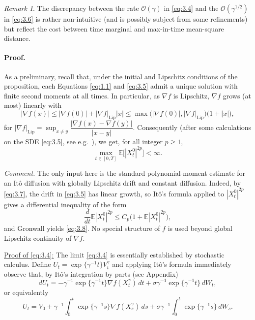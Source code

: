 \documentclass[11pt]{article}
\theoremstyle{remark}
\newtheorem{remark}{Remark}[section]
\begin{document}
\begin{remark}
The discrepancy between the rate $\mathcal{O}(\gamma)$ in \eqref{eq:3.4} and the $\mathcal{O}(\gamma^{1/2})$ in \eqref{eq:3.6} is rather non-intuitive (and is possibly subject from some refinements) but reflect the cost between time marginal and max-in-time mean-square distance.
\end{remark}

\paragraph{Proof.}
As a preliminary, recall that, under the initial and Lipschitz conditions of the proposition, each Equations \eqref{eq:1.1} and \eqref{eq:3.5} admit a unique solution with finite second moments at all times.
In particular, as $\nabla f$ is Lipschitz, $\nabla f$ grows (at most) linearly with
\begin{equation}
\label{eq:3.7}
|\nabla f(x)| \le |\nabla f(0)| + |\nabla f|_{\mathrm{Lip}}|x|
\le \max\bigl(|\nabla f(0)|,|\nabla f|_{\mathrm{Lip}}\bigr)\bigl(1+|x|\bigr),
\end{equation}
for $|\nabla f|_{\mathrm{Lip}}=\sup_{x\neq y}\dfrac{|\nabla f(x)-\nabla f(y)|}{|x-y|}$.
Consequently (after some calculations on the SDE \eqref{eq:3.5}, see e.g.~\cite{ks91}), we get, for all integer $p\ge1$,
\begin{equation}
\label{eq:3.8}
\max_{t\in[0,T]}\mathbb{E}\bigl[|X_t^0|^{2p}\bigr]<\infty.
\end{equation}

{\color{teal}
\noindent\emph{Comment.} The only input here is the standard polynomial-moment estimate for an It\^o diffusion with globally Lipschitz drift and constant diffusion. Indeed, by \eqref{eq:3.7}, the drift in \eqref{eq:3.5} has linear growth, so It\^o's formula applied to $|X_t^0|^{2p}$ gives a differential inequality of the form
\[
\frac{d}{dt}\mathbb{E}|X_t^0|^{2p}\le C_p\bigl(1+\mathbb{E}|X_t^0|^{2p}\bigr),
\]
and Gronwall yields \eqref{eq:3.8}. No special structure of $f$ is used beyond global Lipschitz continuity of $\nabla f$.
}


\underline{Proof of \eqref{eq:3.4}:}
The limit \eqref{eq:3.4} is essentially established by stochastic calculus. Define $U_t=\exp\{\gamma^{-1}t\}V_t^{\gamma}$
and applying It\^o's formula immediately observe that, by It\^o's integration by parts (see Appendix)
\[
dU_t=-\gamma^{-1}\exp\{\gamma^{-1}t\}\nabla f(X_t^{\gamma})\,dt+\sigma\gamma^{-1}\exp\{\gamma^{-1}t\}\,dW_t,
\]
or equivalently
\[
U_t=V_0+\gamma^{-1}\int_0^t \exp\{\gamma^{-1}s\}\nabla f(X_s^{\gamma})\,ds+\sigma\gamma^{-1}\int_0^t \exp\{\gamma^{-1}s\}\,dW_s.
\]
\end{document}
